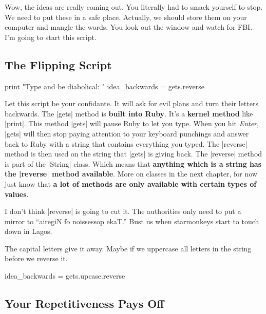 \documentclass[12pt,twoside]{report}
\begin{document}
Wow, the ideas are really coming out.  You literally had to smack
yourself to stop.  We need to put these in a safe place.  Actually, we
should store them on your computer and mangle the words.  You look out
the window and watch for FBI.  I'm going to start this script.



\subsection{The Flipping Script}

\begin{rubycode}
	
 print "Type and be diabolical: " 
 idea_backwards = gets.reverse

\end{rubycode}


Let this script be your confidante.  It will ask for evil plans and
turn their letters backwards. The \rubyinline|gets|
method is {\bf built into Ruby}.  It's a {\bf kernel method} like
\rubyinline|print|.  This method
\rubyinline|gets| will pause Ruby to let you type.
When you hit {\em Enter}, \rubyinline|gets| will then
stop paying attention to your keyboard punchings and answer back to
Ruby with a string that contains everything you typed.  The
\rubyinline|reverse| method is then used on the string
that \rubyinline|gets| is giving back.  The
\rubyinline|reverse| method is part of the
\rubyinline|String| class.  Which means that {\bf
  anything which is a string has the
  \rubyinline|reverse| method available}.  More on
classes in the next chapter, for now just know that {\bf a lot of
  methods are only available with certain types of values}.

I don't think \rubyinline|reverse| is going to cut it.
The authorities only need to put a mirror to ``airegiN fo noissessop
ekaT.''  Bust us when starmonkeys start to touch down in Lagos.

The capital letters give it away.  Maybe if we uppercase all letters
in the string before we reverse it.


\begin{rubycode}
	
 idea_backwards = gets.upcase.reverse

\end{rubycode}




\subsection{Your Repetitiveness Pays Off}
\end{document}
